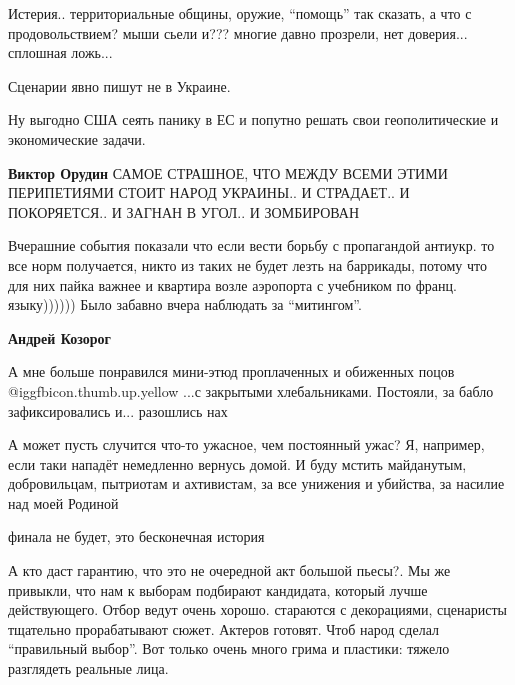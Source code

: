 \begin{itemize}

Истерия.. территориальные общины, оружие, \enquote{помощь} так сказать, а что с
продовольствием? мыши сьели и??? многие давно прозрели, нет доверия... сплошная
ложь...


Сценарии явно пишут не в Украине.

Ну выгодно США сеять панику в ЕС и попутно решать свои геополитические и
экономические задачи.

\begin{itemize} %
\textbf{Виктор Орудин} САМОЕ СТРАШНОЕ, ЧТО МЕЖДУ ВСЕМИ ЭТИМИ ПЕРИПЕТИЯМИ СТОИТ НАРОД УКРАИНЫ.. И СТРАДАЕТ.. И ПОКОРЯЕТСЯ.. И ЗАГНАН В УГОЛ.. И ЗОМБИРОВАН
\end{itemize} %


Вчерашние события показали что если вести борьбу с пропагандой антиукр. то все
норм получается, никто из таких не будет лезть на баррикады, потому что для них
пайка важнее и квартира возле аэропорта с учебником по франц. языку)))))) Было
забавно вчера наблюдать за \enquote{митингом}.

\begin{itemize} %
\textbf{Андрей Козорог} 

А мне больше понравился мини-этюд проплаченных и обиженных поцов @igg{fbicon.thumb.up.yellow} ...с
закрытыми хлебальниками. Постояли, за бабло зафиксировались и... разошлись нах

\end{itemize} %


А может пусть случится что-то ужасное, чем постоянный ужас? Я, например, если
таки нападёт немедленно вернусь домой. И буду мстить майданутым, добровильцам,
пытриотам и ахтивистам, за все унижения и убийства, за насилие над моей Родиной

финала не будет, это бесконечная история


А кто даст гарантию, что это не очередной акт большой пьесы?. Мы же привыкли,
что нам к выборам подбирают кандидата, который лучше действующего. Отбор ведут
очень хорошо. стараются с декорациями, сценаристы тщательно прорабатывают
сюжет. Актеров готовят. Чтоб народ сделал \enquote{правильный выбор}. Вот только очень
много грима и пластики: тяжело разглядеть реальные лица.


\end{itemize}
